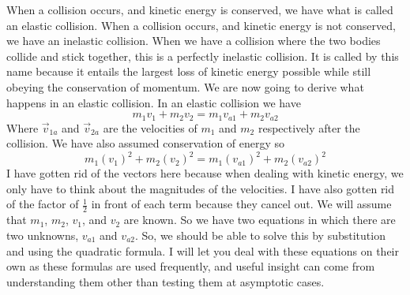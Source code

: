 When a collision occurs, and kinetic energy is conserved, we have what is called an elastic collision. When a collision occurs, and kinetic energy is not conserved, we have an inelastic collision. When we have a collision where the two bodies collide and stick together, this is a perfectly inelastic collision. It is called by this name because it entails the largest loss of kinetic energy possible while still obeying the conservation of momentum. We are now going to derive what happens in an elastic collision. In an elastic collision we have \begin{equation}m_1 v_1+m_2 v_2=m_1v_{a1}+m_2v_{a2}\end{equation} Where $\vec{v}_{1a}$ and $\vec{v}_{2a}$ are the velocities of $m_1$ and $m_2$ respectively after the collision. We have also assumed conservation of energy so \begin{equation}m_1\left(v_1\right)^2+m_2\left(v_2\right)^2=m_1\left(v_{a1}\right)^2+m_2\left(v_{a2}\right)^2\end{equation} I have gotten rid of the vectors here because when dealing with kinetic energy, we only have to think about the magnitudes of the velocities. I have also gotten rid of the factor of $\frac{1}{2}$ in front of each term because they cancel out. We will assume that $m_1$, $m_2$, $v_1$, and $v_2$ are known. So we have two equations in which there are two unknowns, $v_{a1}$ and $v_{a2}$. So, we should be able to solve this by substitution and using the quadratic formula. I will let you deal with these equations on their own as these formulas are used frequently, and useful insight can come from understanding them other than testing them at asymptotic cases. 